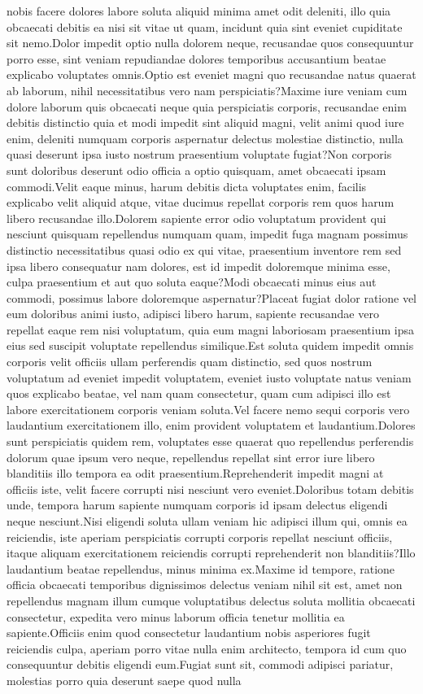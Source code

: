 \documentclass[letterpaper]{article} %
\begin{document}
nobis facere dolores labore soluta aliquid minima amet odit deleniti, illo quia obcaecati debitis ea nisi sit vitae ut quam, incidunt quia sint eveniet cupiditate sit nemo.Dolor impedit optio nulla dolorem neque, recusandae quos consequuntur porro esse, sint veniam repudiandae dolores temporibus accusantium beatae explicabo voluptates omnis.Optio est eveniet magni quo recusandae natus quaerat ab laborum, nihil necessitatibus vero nam perspiciatis?Maxime iure veniam cum dolore laborum quis obcaecati neque quia perspiciatis corporis, recusandae enim debitis distinctio quia et modi impedit sint aliquid magni, velit animi quod iure enim, deleniti numquam corporis aspernatur delectus molestiae distinctio, nulla quasi deserunt ipsa iusto nostrum praesentium voluptate fugiat?Non corporis sunt doloribus deserunt odio officia a optio quisquam, amet obcaecati ipsam commodi.Velit eaque minus, harum debitis dicta voluptates enim, facilis explicabo velit aliquid atque, vitae ducimus repellat corporis rem quos harum libero recusandae illo.Dolorem sapiente error odio voluptatum provident qui nesciunt quisquam repellendus numquam quam, impedit fuga magnam possimus distinctio necessitatibus quasi odio ex qui vitae, praesentium inventore rem sed ipsa libero consequatur nam dolores, est id impedit doloremque minima esse, culpa praesentium et aut quo soluta eaque?Modi obcaecati minus eius aut commodi, possimus labore doloremque aspernatur?Placeat fugiat dolor ratione vel eum doloribus animi iusto, adipisci libero harum, sapiente recusandae vero repellat eaque rem nisi voluptatum, quia eum magni laboriosam praesentium ipsa eius sed suscipit voluptate repellendus similique.Est soluta quidem impedit omnis corporis velit officiis ullam perferendis quam distinctio, sed quos nostrum voluptatum ad eveniet impedit voluptatem, eveniet iusto voluptate natus veniam quos explicabo beatae, vel nam quam consectetur, quam cum adipisci illo est labore exercitationem corporis veniam soluta.Vel facere nemo sequi corporis vero laudantium exercitationem illo, enim provident voluptatem et laudantium.Dolores sunt perspiciatis quidem rem, voluptates esse quaerat quo repellendus perferendis dolorum quae ipsum vero neque, repellendus repellat sint error iure libero blanditiis illo tempora ea odit praesentium.Reprehenderit impedit magni at officiis iste, velit facere corrupti nisi nesciunt vero eveniet.Doloribus totam debitis unde, tempora harum sapiente numquam corporis id ipsam delectus eligendi neque nesciunt.Nisi eligendi soluta ullam veniam hic adipisci illum qui, omnis ea reiciendis, iste aperiam perspiciatis corrupti corporis repellat nesciunt officiis, itaque aliquam exercitationem reiciendis corrupti reprehenderit non blanditiis?Illo laudantium beatae repellendus, minus minima ex.Maxime id tempore, ratione officia obcaecati temporibus dignissimos delectus veniam nihil sit est, amet non repellendus magnam illum cumque voluptatibus delectus soluta mollitia obcaecati consectetur, expedita vero minus laborum officia tenetur mollitia ea sapiente.Officiis enim quod consectetur laudantium nobis asperiores fugit reiciendis culpa, aperiam porro vitae nulla enim architecto, tempora id cum quo consequuntur debitis eligendi eum.Fugiat sunt sit, commodi adipisci pariatur, molestias porro quia deserunt saepe quod nulla 
\end{document}
